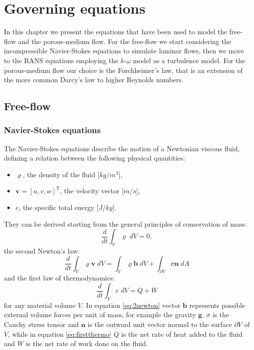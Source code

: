 \chapter{Governing equations} \label{chap:equations} %
In this chapter we present the equations that have been used to model the 
free-flow and the porous-medium flow. For the free-flow we start 
considering the incompressible Navier-Stokes equations to simulate laminar 
flows, then we move to the RANS equations employing the $k\text{-}\omega$ 
model as a turbulence model. For the porous-medium 
flow our choice is the Forchheimer's law, that is an extension of the more 
common Darcy's law to higher Reynolds numbers.
\section{Free-flow}
\subsection{Navier-Stokes equations}
The Navier-Stokes equations describe the motion of a Newtonian viscous fluid,
defining a relation between the following physical quantities:
\begin{itemize}
	\item $\varrho$, the density of the fluid  [$\si{kg/m^3}$],
	\item $\mathbf{v} = [u, v, w]^\mathrm{T}$, the velocity vector [$\si{m/s}$],
	\item $e$, the specific total energy [$\si{J/kg}$].
\end{itemize}
They can be derived starting from the general principles of conservation of 
mass:
\begin{equation} \label{eq:masscons}
\frac{d}{dt} \int_V \varrho \; dV = 0,
\end{equation}
the second Newton's law:
\begin{equation} \label{eq:2newton}
\frac{d}{dt} \int_V \varrho \mathbf{v} \; dV = \int_V \varrho \mathbf{b} \; dV 
+ 
\int_{\partial V} \sigma \mathbf{n} \; dA
\end{equation}
and the first law of thermodynamics:
\begin{equation} \label{eq:firstthermo}
\frac{d}{dt} \int_V e \; dV = \dot{Q} + \dot{W}
\end{equation}
for any material volume $V$. In equation \eqref{eq:2newton} vector 
$\mathbf{b}$ represents possible external volume forces per unit of mass, for 
example the gravity $\mathbf{g}$. $\sigma$ is the Cauchy stress tensor 
and 
$\mathbf{n}$ is the outward unit vector normal to the surface $\partial V$ of 
$V$, while in equation \eqref{eq:firstthermo} $\dot{Q}$ is the net rate of 
heat added to the fluid and $\dot{W}$ is the net rate of work done on the fluid.

